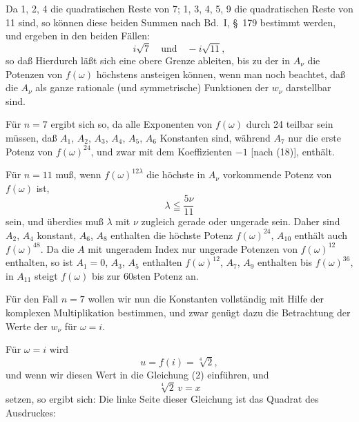 
Da 1, 2, 4 die quadratischen Reste von 7; 1, 3, 4, 5, 9 die
quadratischen Reste von 11 sind, so können diese beiden Summen nach
Bd.~I, \S\ 179 bestimmt werden, und ergeben in den beiden Fällen:
\[
i\sqrt{7} \quad \text{und} \quad -i\sqrt{11},
\]
so daß
Hierdurch läßt sich eine obere Grenze ableiten, bis zu der in
$A_\nu$ die Potenzen von $f(\omega)$ höchstens ansteigen können,
wenn man noch beachtet, daß die $A_\nu$ als ganze rationale (und
symmetrische) Funktionen der $w_\nu$ darstellbar sind.

Für $n=7$ ergibt sich so, da alle Exponenten von $f(\omega)$ durch
24 teilbar sein müssen, daß $A_1$, $A_2$, $A_3$, $A_4$, $A_5$, $A_6$
Konstanten sind, während $A_7$ nur die erste Potenz von
$f(\omega)^{24}$, und zwar mit dem Koeffizienten $-1$ [nach (18)],
enthält.

Für $n=11$ muß, wenn $f(\omega)^{12\lambda}$ die höchste in $A_\nu$
vorkommende Potenz von $f(\omega)$ ist,
\[
\lambda \leqq \frac{5\nu}{11}
\]
sein, und überdies muß $\lambda$ mit $\nu$ zugleich gerade oder
ungerade sein. Daher sind $A_2$, $A_4$ konstant, $A_6$, $A_8$
enthalten die höchste Potenz $f(\omega)^{24}$, $A_{10}$ enthält
auch $f(\omega)^{48}$. Da die $A$ mit ungeradem Index nur ungerade
Potenzen von $f(\omega)^{12}$ enthalten, so ist $A_1 = 0$, $A_3$,
$A_5$ enthalten $f(\omega)^{12}$, $A_7$, $A_9$ enthalten bis
$f(\omega)^{36}$, in $A_{11}$ steigt $f(\omega)$ bis zur 60sten
Potenz an.

Für den Fall $n=7$ wollen wir nun die Konstanten vollständig mit
Hilfe der komplexen Multiplikation bestimmen, und zwar genügt dazu
die Betrachtung der Werte der $w_\nu$ für $\omega = i$.

Für $\omega = i$ wird
\[
u = f(i) = \sqrt[4]{2},
\]
und wenn wir diesen Wert in die Gleichung (2) einführen, und
\[
\sqrt[4]{2}\, v = x
\]
setzen, so ergibt sich:
Die linke Seite dieser Gleichung ist das Quadrat des Ausdruckes:
